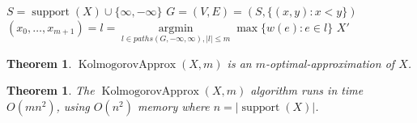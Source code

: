 \documentclass{article}
\newtheorem{theorem}[thm]{Theorem}
\DeclareMathOperator{\support}{support}
\DeclareMathOperator{\KlmApprox}{KolmogorovApprox}
\begin{document}
\begin{algorithm}\label{alg:optapprox}
	\DontPrintSemicolon
	$S = \support(X)\cup \{\infty,-\infty\}$\;
	$G=(V,E)=(S, \{ (x,y)  \colon  x<y \})$  \;
	$(x_0,\dots,x_{m+1}) = l = \operatorname{argmin}\limits_{l \in paths(G,-\infty,\infty),|l|\leq m}  \max \{ w(e)\colon e \in l  \}$  \;
	\Return $X'$\;
	
	\caption{$\KlmApprox (X, m)$}  
	\label{alg:sequence}
\end{algorithm}


%	
%	
%	
%		
%	

\begin{theorem}\label{the:algo}
	$\KlmApprox(X,m)$ is an $m$-optimal-approximation of $X$.
\end{theorem}


\begin{theorem}\label{the:complexity}
	The $\KlmApprox(X,m)$ algorithm runs in time $O(mn^2)$, using $O(n^2)$ memory where $n=|\support(X)|$.
\end{theorem}
\end{document}
